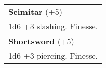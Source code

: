 \documentclass[twocolumn]{article}
\begin{document}
%

\vspace{40pt}

\\
\noindent\begin{tabular}{|m{3.1in}|}
\hline
\textbf{Scimitar} (+5) \\
1d6 +3 slashing. Finesse.\\
\textbf{Shortsword} (+5) \\
1d6 +3 piercing. Finesse.\\

\hline
\end{tabular}
\vspace{8pt}
\end{document}
